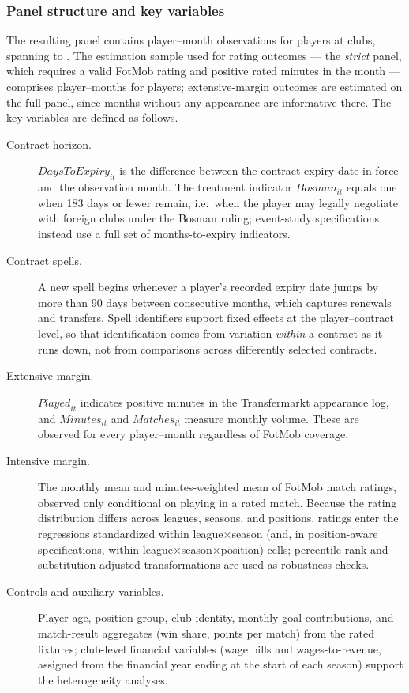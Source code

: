\documentclass{article}
\begin{document}
\subsubsection{Panel structure and key variables}

The resulting panel contains \NPanelObs{} player--month observations for
\NPanelPlayers{} players at \NPanelClubs{} clubs, spanning \FirstMonth{}
to \LastMonth{}. The estimation sample used for rating outcomes ---
the \emph{strict} panel, which requires a valid FotMob rating and
positive rated minutes in the month --- comprises \NStrictObs{}
player--months for \NStrictPlayers{} players; extensive-margin outcomes are
estimated on the full panel, since months without any appearance are
informative there. The key variables are defined as follows.

\begin{description}
  \item[Contract horizon.] $\mathit{DaysToExpiry}_{it}$ is the
  difference between the contract expiry date in force and the
  observation month. The treatment indicator
  $\mathit{Bosman}_{it}$ equals one when 183 days or fewer remain,
  i.e.\ when the player may legally negotiate with foreign clubs
  under the Bosman ruling; event-study specifications instead use a
  full set of months-to-expiry indicators.

  \item[Contract spells.] A new spell begins whenever a player's
  recorded expiry date jumps by more than 90 days between consecutive
  months, which captures renewals and transfers. Spell identifiers
  support fixed effects at the player--contract level, so that
  identification comes from variation \emph{within} a contract as it
  runs down, not from comparisons across differently selected
  contracts.

  \item[Extensive margin.] $\mathit{Played}_{it}$ indicates positive
  minutes in the Transfermarkt appearance log, and
  $\mathit{Minutes}_{it}$ and $\mathit{Matches}_{it}$ measure monthly
  volume. These are observed for every player--month regardless of
  FotMob coverage.

  \item[Intensive margin.] The monthly mean and minutes-weighted mean
  of FotMob match ratings, observed only conditional on playing in a
  rated match. Because the rating distribution differs across
  leagues, seasons, and positions, ratings enter the regressions
  standardized within league$\times$season (and, in position-aware
  specifications, within league$\times$season$\times$position) cells;
  percentile-rank and substitution-adjusted transformations are used
  as robustness checks.

  \item[Controls and auxiliary variables.] Player age, position
  group, club identity, monthly goal contributions, and match-result
  aggregates (win share, points per match) from the rated fixtures;
  club-level financial variables (wage bills and wages-to-revenue,
  assigned from the financial year ending at the start of each
  season) support the heterogeneity analyses.
\end{description}
\end{document}
